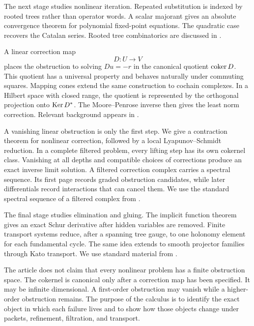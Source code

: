 The next stage studies nonlinear iteration.  Repeated substitution is indexed by rooted trees rather than operator words.  A scalar majorant gives an absolute convergence theorem for polynomial fixed-point equations.  The quadratic case recovers the Catalan series.  Rooted tree combinatorics are discussed in \cite{Stanley2012,LodayVallette2012,HairerLubichWanner2006}.

A linear correction map
\[
D:U\longrightarrow V
\]
places the obstruction to solving $Du=-r$ in the canonical quotient $\operatorname{coker} D$.  This quotient has a universal property and behaves naturally under commuting squares.  Mapping cones extend the same construction to cochain complexes.  In a Hilbert space with closed range, the quotient is represented by the orthogonal projection onto $\operatorname{Ker} D^*$.  The Moore--Penrose inverse then gives the least norm correction.  Relevant background appears in \cite{Weibel1994,Penrose1955}.

A vanishing linear obstruction is only the first step.  We give a contraction theorem for nonlinear correction, followed by a local Lyapunov--Schmidt reduction.  In a complete filtered problem, every lifting step has its own cokernel class.  Vanishing at all depths and compatible choices of corrections produce an exact inverse limit solution.  A filtered correction complex carries a spectral sequence.  Its first page records graded obstruction candidates, while later differentials record interactions that can cancel them.  We use the standard spectral sequence of a filtered complex from \cite{Weibel1994,McCleary2001}.

The final stage studies elimination and gluing.  The implicit function theorem gives an exact Schur derivative after hidden variables are removed.  Finite transport systems reduce, after a spanning tree gauge, to one holonomy element for each fundamental cycle.  The same idea extends to smooth projector families through Kato transport.  We use standard material from \cite{Deimling1985,GrossTucker1987,Kato1950,Kato1995,KobayashiNomizu1963}.

The article does not claim that every nonlinear problem has a finite obstruction space.  The cokernel is canonical only after a correction map has been specified.  It may be infinite dimensional.  A first-order obstruction may vanish while a higher-order obstruction remains.  The purpose of the calculus is to identify the exact object in which each failure lives and to show how those objects change under packets, refinement, filtration, and transport.


